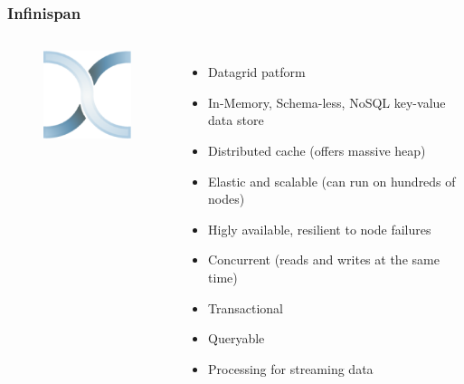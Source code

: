\documentclass[10pt,utf8]{beamer}
\begin{document}
\begin{frame}
	\frametitle{Infinispan}
	\begin{columns}
		\begin{figure}
			\centering
			\includegraphics[width=3cm]{./img/infinispan.eps}
		\end{figure}
		\begin{itemize}
			\item Datagrid patform
			\item In-Memory, Schema-less, NoSQL key-value data store
			\item Distributed cache (offers massive heap)
			\item Elastic and scalable (can run on hundreds of nodes)
			\item Higly available, resilient to node failures
			\item Concurrent (reads and writes at the same time)
			\item Transactional
			\item Queryable
			\item Processing for streaming data
		\end{itemize}
	\end{columns}
\end{frame}
\end{document}
